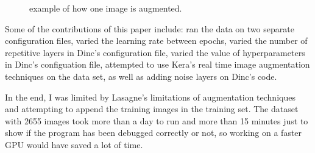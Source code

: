 \documentclass[11pt,twocolumn]{article}
\begin{document}
\begin{figure}
  \centering
  \hspace*{1em}
  \hspace*{1em}
  \hspace*{1em}
  \hspace*{1em}
  \caption{example of how one image is augmented. \label{fig:TypicalImages}}
\end{figure}

Some of the contributions of this paper include: ran  the data on two separate configuration files, varied the learning rate between epochs, varied the number of repetitive layers in Dinc's configuration file, varied the value of hyperparameters in Dinc's configuation file, attempted to use Kera's real time image augmentation techniques on the data set, as well as adding noise layers on Dinc's code. 

In the end, I was limited by Lasagne's limitations of augmentation techniques and attempting to append the training images in the training set. The dataset with 2655 images took more than a day to run and more than 15 minutes just to show if the program has been debugged correctly or not, so working on a faster GPU would have saved a lot of time.
\end{document}
